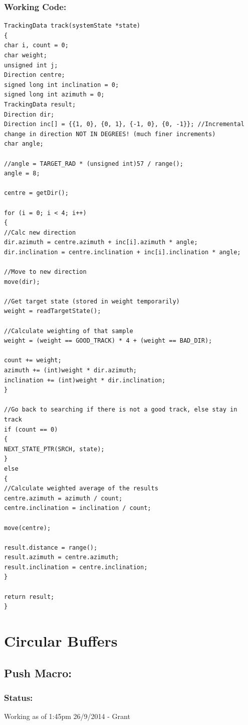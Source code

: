 \documentclass[]{report}
\begin{document}
\subsubsection{Working Code:}
\begin{lstlisting}
TrackingData track(systemState *state)
{
char i, count = 0;
char weight;
unsigned int j;
Direction centre;
signed long int inclination = 0;
signed long int azimuth = 0;
TrackingData result;
Direction dir;
Direction inc[] = {{1, 0}, {0, 1}, {-1, 0}, {0, -1}}; //Incremental change in direction NOT IN DEGREES! (much finer increments)
char angle;

//angle = TARGET_RAD * (unsigned int)57 / range();
angle = 8;

centre = getDir();

for (i = 0; i < 4; i++)
{
//Calc new direction
dir.azimuth = centre.azimuth + inc[i].azimuth * angle;
dir.inclination = centre.inclination + inc[i].inclination * angle;

//Move to new direction
move(dir);

//Get target state (stored in weight temporarily)
weight = readTargetState();

//Calculate weighting of that sample
weight = (weight == GOOD_TRACK) * 4 + (weight == BAD_DIR);

count += weight;
azimuth += (int)weight * dir.azimuth;
inclination += (int)weight * dir.inclination;
}

//Go back to searching if there is not a good track, else stay in track
if (count == 0)
{
NEXT_STATE_PTR(SRCH, state);
}
else
{
//Calculate weighted average of the results
centre.azimuth = azimuth / count;
centre.inclination = inclination / count;

move(centre);

result.distance = range();
result.azimuth = centre.azimuth;
result.inclination = centre.inclination;
}

return result;
}
\end{lstlisting}

\newpage
\section{Circular Buffers}
\subsection{Push Macro:}
\subsubsection{Status:}
Working as of 1:45pm 26/9/2014 - Grant
\end{document}
